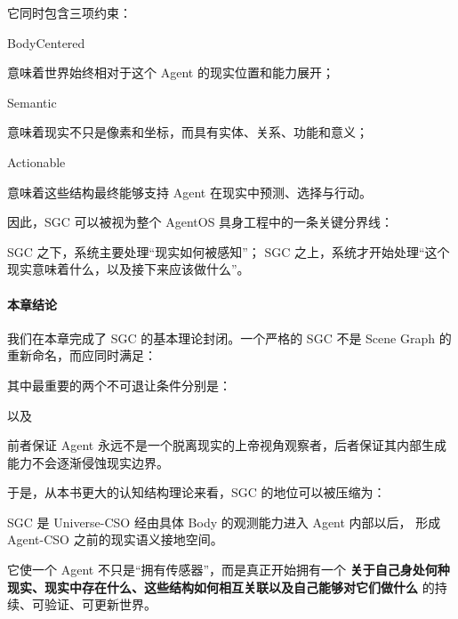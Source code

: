 它同时包含三项约束：

\begin{statementbox}
BodyCentered
\end{statementbox}
意味着世界始终相对于这个 Agent 的现实位置和能力展开；

\begin{statementbox}
Semantic
\end{statementbox}
意味着现实不只是像素和坐标，而具有实体、关系、功能和意义；

\begin{statementbox}
Actionable
\end{statementbox}
意味着这些结构最终能够支持 Agent 在现实中预测、选择与行动。

因此，SGC 可以被视为整个 AgentOS 具身工程中的一条关键分界线：

\begin{statementbox}
SGC 之下，系统主要处理“现实如何被感知”；
SGC 之上，系统才开始处理“这个现实意味着什么，以及接下来应该做什么”。
\end{statementbox}

\paragraph{本章结论}

我们在本章完成了 SGC 的基本理论封闭。一个严格的 SGC 不是 Scene Graph 的重新命名，而应同时满足：
\begin{statementbox}
\centering
{}
\end{statementbox}
其中最重要的两个不可退让条件分别是：
\begin{statementbox}
\centering
{}
\end{statementbox}
以及
\begin{statementbox}
\centering
{}
\end{statementbox}
前者保证 Agent 永远不是一个脱离现实的上帝视角观察者，后者保证其内部生成能力不会逐渐侵蚀现实边界。

于是，从本书更大的认知结构理论来看，SGC 的地位可以被压缩为：
\begin{statementbox}
SGC 是 Universe-CSO 经由具体 Body 的观测能力进入 Agent 内部以后，
形成 Agent-CSO 之前的现实语义接地空间。
\end{statementbox}
它使一个 Agent 不只是“拥有传感器”，而是真正开始拥有一个
\textbf{关于自己身处何种现实、现实中存在什么、这些结构如何相互关联以及自己能够对它们做什么}
的持续、可验证、可更新世界。

